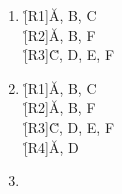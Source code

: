 \documentclass{lehramt-informatik-aufgabe}
\begin{document}
\begin{enumerate}
\begin{liAntwort}
\begin{enumerate}
\begin{enumerate}
\item {}

\liNichtsZuTun

\item {}

\liNichtsZuTun

\end{enumerate}
\item {}

\r[R1]{\u{A, B}, C}\\
\r[R2]{\u{A, B}, F}\\
\r[R3]{\u{C, D}, E, F}\\

\item {}

\r[R1]{\u{A, B}, C}\\
\r[R2]{\u{A, B}, F}\\
\r[R3]{\u{C, D}, E, F}\\
\r[R4]{\u{A, D}}\\

\item {}

\liNichtsZuTun
\end{enumerate}
\end{liAntwort}

\end{enumerate}
\end{document}
